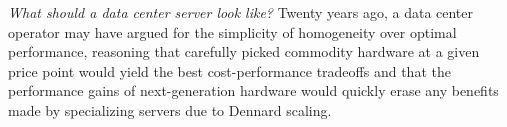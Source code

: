 \documentclass[12pt]{ucsddissertation}
\begin{document}
\begin{dissertationintroduction}


\textit{What should a data center server look like?} Twenty years ago, a data center operator may
have argued for the simplicity of homogeneity over optimal performance, reasoning that carefully
picked commodity hardware at a given price point would yield the best cost-performance tradeoffs and that the
performance gains of next-generation hardware would quickly erase any benefits made by specializing
servers due to Dennard scaling.








\end{dissertationintroduction}
\end{document}
